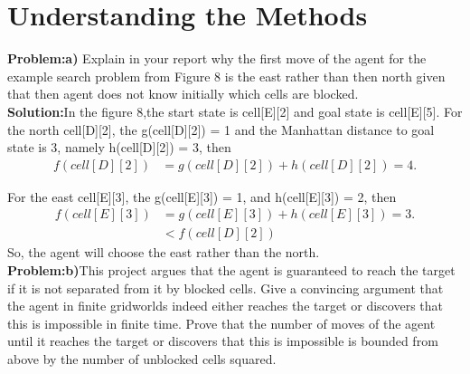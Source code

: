 \section{Understanding the Methods}

\textbf{Problem:a)} Explain in your report why the first move of the agent for the example search problem from Figure 8 is the east rather than then north given that then agent does not know initially which cells are blocked.\\

\textbf{Solution:}In the figure 8,the start state is cell[E][2] and goal state is cell[E][5]. For the north cell[D][2], the g(cell[D][2]) = 1 and the Manhattan distance to goal state is 3, namely h(cell[D][2]) = 3, then\\ 
\begin{equation*}
  \begin{aligned}  
  f(cell[D][2]) &= g(cell[D][2]) + h(cell[D][2]) = 4. 
  \end{aligned}
\end{equation*}

For the east cell[E][3], the g(cell[E][3]) = 1, and h(cell[E][3]) = 2, then\\ 
\begin{equation*}
  \begin{aligned}  
  f(cell[E][3]) &= g(cell[E][3]) + h(cell[E][3]) = 3. \\
                &< f(cell[D][2])
  \end{aligned}
\end{equation*}
So, the agent will choose the east rather than the north.\\

\textbf{Problem:b)}This project argues that the agent is guaranteed to reach the target if it is not separated from it by blocked cells. Give a convincing argument that the agent in finite gridworlds indeed either reaches the target or discovers that this is impossible in finite time. Prove that the number of moves of the agent until it reaches the target or discovers that this is impossible is bounded from above by the number of unblocked cells squared.\\

